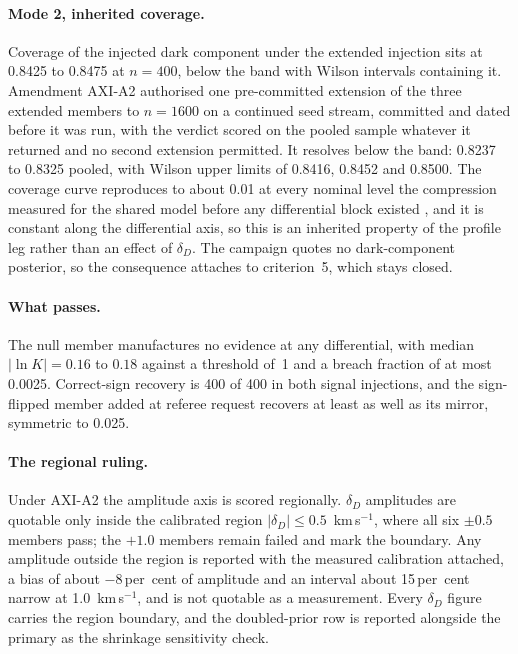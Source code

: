 \documentclass[11pt]{article}
\newcommand{\dD}{\ensuremath{\delta_D}}
\begin{document}
\paragraph{Mode 2, inherited coverage.} Coverage of the injected dark component under the extended injection sits at 0.8425 to 0.8475 at $n = 400$, below the band with Wilson intervals containing it. Amendment AXI-A2 authorised one pre-committed extension of the three extended members to $n = 1600$ on a continued seed stream, committed and dated before it was run, with the verdict scored on the pooled sample whatever it returned and no second extension permitted. It resolves below the band: 0.8237 to 0.8325 pooled, with Wilson upper limits of 0.8416, 0.8452 and 0.8500. The coverage curve reproduces to about 0.01 at every nominal level the compression measured for the shared model before any differential block existed \citep{HCalReport2026}, and it is constant along the differential axis, so this is an inherited property of the profile leg rather than an effect of \dD{}. The campaign quotes no dark-component posterior, so the consequence attaches to criterion~5, which stays closed.

\paragraph{What passes.} The null member manufactures no evidence at any differential, with median $|\ln K| = 0.16$ to $0.18$ against a threshold of~1 and a breach fraction of at most 0.0025. Correct-sign recovery is 400 of 400 in both signal injections, and the sign-flipped member added at referee request recovers at least as well as its mirror, symmetric to 0.025.

\paragraph{The regional ruling.} Under AXI-A2 the amplitude axis is scored regionally. \dD{} amplitudes are quotable only inside the calibrated region $|\dD| \leq 0.5$~km\,s$^{-1}$, where all six $\pm0.5$ members pass; the $+1.0$ members remain failed and mark the boundary. Any amplitude outside the region is reported with the measured calibration attached, a bias of about $-8$\,per~cent of amplitude and an interval about 15\,per~cent narrow at 1.0~km\,s$^{-1}$, and is not quotable as a measurement. Every \dD{} figure carries the region boundary, and the doubled-prior row is reported alongside the primary as the shrinkage sensitivity check.
\end{document}
